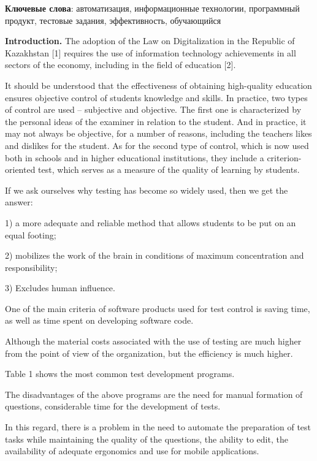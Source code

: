 {\bfseries Ключевые слова}: автоматизация, информационные технологии,
программный продукт, тестовые задания, эффективность, обучающийся

\begin{multicols}{2}

{\bfseries Introduction.} The adoption of the Law on Digitalization in the
Republic of Kazakhstan {[}1{]} requires the use of information
technology achievements in all sectors of the economy, including in the
field of education {[}2{]}.

It should be understood that the effectiveness of obtaining high-quality
education ensures objective control of students\textquotesingle{}
knowledge and skills. In practice, two types of control are used --
subjective and objective. The first one is characterized by the personal
ideas of the examiner in relation to the student. And in practice, it
may not always be objective, for a number of reasons, including the
teacher\textquotesingle s likes and dislikes for the student. As for the
second type of control, which is now used both in schools and in higher
educational institutions, they include a criterion-oriented test, which
serves as a measure of the quality of learning by students.

If we ask ourselves why testing has become so widely used, then we get
the answer:

1) a more adequate and reliable method that allows students to be put on
an equal footing;

2) mobilizes the work of the brain in conditions of maximum
concentration and responsibility;

3) Excludes human influence.

One of the main criteria of software products used for test control is
saving time, as well as time spent on developing software code.

Although the material costs associated with the use of testing are much
higher from the point of view of the organization, but the efficiency is
much higher.

Table 1 shows the most common test development programs.

The disadvantages of the above programs are the need for manual
formation of questions, considerable time for the development of tests.

In this regard, there is a problem in the need to automate the
preparation of test tasks while maintaining the quality of the
questions, the ability to edit, the availability of adequate ergonomics
and use for mobile applications.



\end{multicols}
